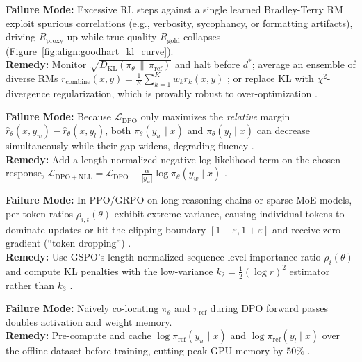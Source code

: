 \documentclass[../../../../master.tex]{subfiles}
\begin{document}
\begin{pitfall}
\textbf{Failure Mode:} Excessive RL steps against a single learned Bradley-Terry RM exploit spurious correlations (e.g., verbosity, sycophancy, or formatting artifacts), driving $R_{\mathrm{proxy}}$ up while true quality $R_{\mathrm{gold}}$ collapses (Figure~\ref{fig:align:goodhart_kl_curve}).\\
\textbf{Remedy:} Monitor $\sqrt{D_{\mathrm{KL}}(\pi_\theta \,\|\, \pi_{\mathrm{ref}})}$ and halt before $d^*$; average an ensemble of diverse RMs $r_{\mathrm{combine}}(x,y) = \frac{1}{K}\sum_{k=1}^K w_k r_k(x,y)$ ; or replace KL with $\chi^2$-divergence regularization, which is provably robust to over-optimization .
\end{pitfall}

\begin{pitfall}
\textbf{Failure Mode:} Because $\mathcal{L}_{\mathrm{DPO}}$ only maximizes the \emph{relative} margin $\hat{r}_\theta(x,y_w) - \hat{r}_\theta(x,y_l)$, both $\pi_\theta(y_w \mid x)$ and $\pi_\theta(y_l \mid x)$ can decrease simultaneously while their gap widens, degrading fluency .\\
\textbf{Remedy:} Add a length-normalized negative log-likelihood term on the chosen response, $\mathcal{L}_{\mathrm{DPO+NLL}} = \mathcal{L}_{\mathrm{DPO}} - \frac{\alpha}{|y_w|}\log \pi_\theta(y_w \mid x)$ .
\end{pitfall}

\begin{pitfall}
\textbf{Failure Mode:} In PPO/GRPO on long reasoning chains or sparse MoE models, per-token ratios $\rho_{i,t}(\theta)$ exhibit extreme variance, causing individual tokens to dominate updates or hit the clipping boundary $[1-\varepsilon, 1+\varepsilon]$ and receive zero gradient (``token dropping'') .\\
\textbf{Remedy:} Use GSPO's length-normalized sequence-level importance ratio $\rho_i(\theta)$ and compute KL penalties with the low-variance $k_2 = \frac{1}{2}(\log r)^2$ estimator rather than $k_3$ .
\end{pitfall}

\begin{pitfall}
\textbf{Failure Mode:} Naively co-locating $\pi_\theta$ and $\pi_{\mathrm{ref}}$ during DPO forward passes doubles activation and weight memory.\\
\textbf{Remedy:} Pre-compute and cache $\log \pi_{\mathrm{ref}}(y_w \mid x)$ and $\log \pi_{\mathrm{ref}}(y_l \mid x)$ over the offline dataset before training, cutting peak GPU memory by $50\%$ .
\end{pitfall}
\end{document}
